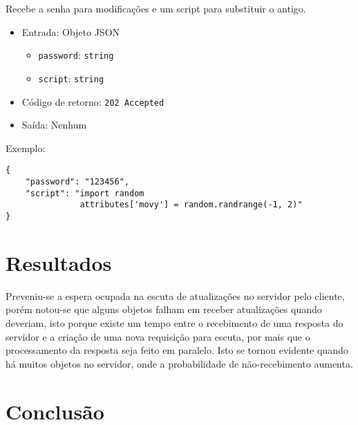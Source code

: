 \documentclass[12pt,a4paper]{article}
\begin{document}
Recebe a senha para modificações e um script para substituir o antigo.

\begin{itemize}
	\item Entrada: Objeto JSON
		\begin{itemize}
			\item \texttt{password}: \texttt{string}
			\item \texttt{script}: \texttt{string}
		\end{itemize}
	\item Código de retorno: \texttt{202 Accepted}
	\item Saída: Nenhum
\end{itemize}

Exemplo:

\begin{verbatim}
{
    "password": "123456",
    "script": "import random
               attributes['movy'] = random.randrange(-1, 2)"
}
\end{verbatim}

\pagebreak \section{Resultados}

Preveniu-se a espera ocupada na escuta de atualizações no servidor pelo
cliente, porém notou-se que alguns objetos falham em receber atualizações
quando deveriam, isto porque existe um tempo entre o recebimento de uma
resposta do servidor e a criação de uma nova requisição para escuta, por mais
que o processamento da resposta seja feito em paralelo. Isto se tornou evidente
quando há muitos objetos no servidor, onde a probabilidade de não-recebimento
aumenta.

\pagebreak \section{Conclusão}

%
%
\end{document}

